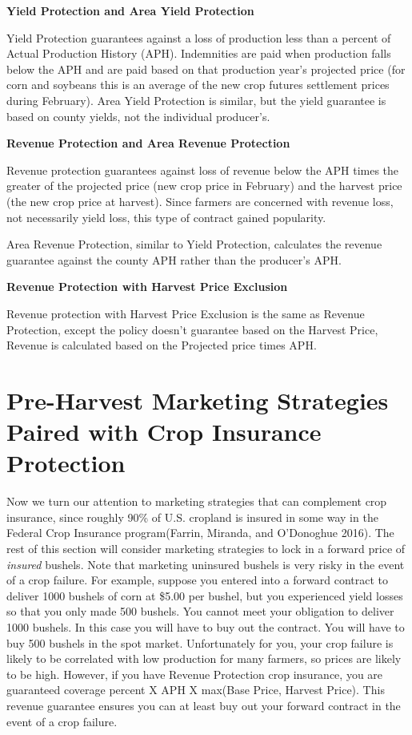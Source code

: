 \documentclass[
  letterpaper,
  DIV=11,
  numbers=noendperiod]{scrreprt}
\begin{document}
\textbf{Yield Protection and Area Yield Protection}

Yield Protection guarantees against a loss of production less than a
percent of Actual Production History (APH). Indemnities are paid when
production falls below the APH and are paid based on that production
year's projected price (for corn and soybeans this is an average of the
new crop futures settlement prices during February). Area Yield
Protection is similar, but the yield guarantee is based on county
yields, not the individual producer's.

\textbf{Revenue Protection and Area Revenue Protection}

Revenue protection guarantees against loss of revenue below the APH
times the greater of the projected price (new crop price in February)
and the harvest price (the new crop price at harvest). Since farmers are
concerned with revenue loss, not necessarily yield loss, this type of
contract gained popularity.

Area Revenue Protection, similar to Yield Protection, calculates the
revenue guarantee against the county APH rather than the producer's APH.

\textbf{Revenue Protection with Harvest Price Exclusion}

Revenue protection with Harvest Price Exclusion is the same as Revenue
Protection, except the policy doesn't guarantee based on the Harvest
Price, Revenue is calculated based on the Projected price times APH.

\section{Pre-Harvest Marketing Strategies Paired with Crop Insurance
Protection}\label{pre-harvest-marketing-strategies-paired-with-crop-insurance-protection}

Now we turn our attention to marketing strategies that can complement
crop insurance, since roughly 90\% of U.S. cropland is insured in some
way in the Federal Crop Insurance program(Farrin, Miranda, and
O'Donoghue 2016). The rest of this section will consider marketing
strategies to lock in a forward price of \emph{insured} bushels. Note
that marketing uninsured bushels is very risky in the event of a crop
failure. For example, suppose you entered into a forward contract to
deliver 1000 bushels of corn at \$5.00 per bushel, but you experienced
yield losses so that you only made 500 bushels. You cannot meet your
obligation to deliver 1000 bushels. In this case you will have to buy
out the contract. You will have to buy 500 bushels in the spot market.
Unfortunately for you, your crop failure is likely to be correlated with
low production for many farmers, so prices are likely to be high.
However, if you have Revenue Protection crop insurance, you are
guaranteed coverage percent X APH X max(Base Price, Harvest Price). This
revenue guarantee ensures you can at least buy out your forward contract
in the event of a crop failure.
\end{document}
